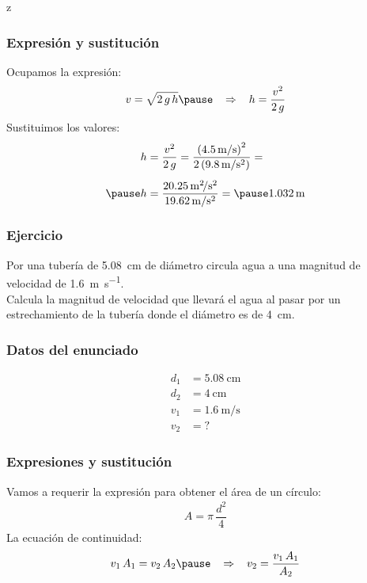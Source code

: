 z\documentclass[14pt]{beamer}
\begin{document}
\begin{frame}
\frametitle{Expresión y sustitución}
Ocupamos la expresión:
\pause
\begin{eqnarray*}
\begin{aligned}
v = \sqrt{2 \, g \, h} \pause \hspace*{0.3cm} \Rightarrow \hspace*{0.3cm} h = \dfrac{v^{2}}{2 \, g}
\end{aligned}
\end{eqnarray*}
Sustituimos los valores:
\pause
\begin{eqnarray*}
\begin{aligned}
h &= \dfrac{v^{2}}{2 \, g} = \dfrac{\left( \SI[per-mode=symbol]{4.5}{\meter\per\second} \right)^{2}}{ 2 \left( \SI[per-mode=symbol]{9.8}{\meter\per\square\second}\right)} = \\[0.5em] \pause
h &= \dfrac{\SI[per-mode=symbol]{20.25}{\square\meter\per\square\second}}{\SI[per-mode=symbol]{19.62}{\meter\per\square\second}} = \pause \SI{1.032}{\meter}
\end{aligned}
\end{eqnarray*}
\end{frame}
\begin{frame}
\frametitle{Ejercicio}
Por una tubería de \SI{5.08}{\centi\meter} de diámetro circula agua a una magnitud de velocidad de \SI[per-mode=symbol]{1.6}{\meter\per\second}.
\\
\bigskip
\pause
Calcula la magnitud de velocidad que llevará el agua al pasar por un estrechamiento de la tubería donde el diámetro es de \SI{4}{\centi\meter}.
\end{frame}
\begin{frame}
\frametitle{Datos del enunciado}
\begin{align*}
d_{1} &= \SI{5.08}{\centi\meter} \\[0.5em]
d_{2} &= \SI{4}{\centi\meter} \\[0.5em]
v_{1} &= \SI[per-mode=symbol]{1.6}{\meter\per\second} \\[0.5em]
v_{2} &= ?
\end{align*}
\end{frame}
\begin{frame}
\frametitle{Expresiones y sustitución}
Vamos a requerir la expresión para obtener el área de un círculo:
\pause
\begin{align*}
A = \pi \, \dfrac{d^{2}}{4}
\end{align*}
\pause
La ecuación de continuidad:
\pause
\begin{eqnarray*}
\begin{aligned}
v_{1} \, A_{1} = v_{2} \, A_{2} \pause \hspace*{0.3cm} \Rightarrow \hspace*{0.3cm} v_{2} = \dfrac{v_{1} \, A_{1}}{A_{2}}
\end{aligned}
\end{eqnarray*}
\end{frame}
\end{document}
